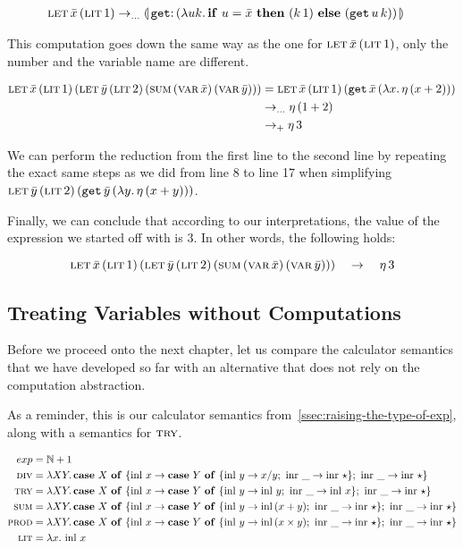 \begin{align*}
  \app{\lete}{\bar{x}}{\litec{1}}
&\to_{\ldots} \banana{\onto{\op{get}}{(\lam{u k}{\ifte{u = \bar{x}}{(\ap{k}{1})}{(\app{\op{get}}{u}{k})}})}}
\end{align*}

This computation goes down the same way as the one for
$\app{\lete}{\bar{x}}{\litec{1}}$, only the number and the variable name
are different.


\begin{align*}
\letecn{x}{\litec{1}}{\letec{y}{\litec{2}}{\sumec{\varec{x}}{\varec{y}}}}
& = \letecn{x}{\litec{1}}{(\app{\op{get}}{\bar{x}} {(\lam{x}{\ap{\eta}{(x + 2)}})})} \\
& \to_{\ldots} \ap{\eta}{(1 + 2)} \\
& \to_{+} \ap{\eta}{3}
\end{align*}

We can perform the reduction from the first line to the second line by
repeating the exact same steps as we did from line 8 to line 17 when
simplifying $\appp{\lete}{\bar{y}}{\litec{2}}
{(\app{\op{get}}{\bar{y}}{(\lam{y}{\ap{\eta}{(x + y)}})})}$.

Finally, we can conclude that according to our interpretations, the
value of the expression we started off with is $3$. In other words, the
following holds:

$$
\letecn{x}{\litec{1}}{\letec{y}{\litec{2}}{\sumec{\varec{x}}{\varec{y}}}}
\quad \to \quad
\ap{\eta}{3}
$$


\subsection{Treating Variables without Computations}

Before we proceed onto the next chapter, let us compare the calculator
semantics that we have developed so far with an alternative that does not
rely on the computation abstraction.

As a reminder, this is our calculator semantics
from~\ref{ssec:raising-the-type-of-exp}, along with a semantics for
$\trye$.

\begin{align*}
  exp &= \NN + 1 \\
  \dive &= \lam{X Y}{\case{X}{x}{\case{Y}{y}{x / y}{\_}{\ap{\inr}{\star}}}{\_}{\ap{\inr}{\star}}} \\ 
  \trye &= \lam{X Y}{\case{X}{x}{\case{Y}{y}{\ap{\inl}{y}}{\_}{\ap{\inl}{x}}}{\_}{\ap{\inr}{\star}}} \\ 
  \sume &= \lam{X Y}{\case{X}{x}{\case{Y}{y}{\ap{\inl}{(x + y)}}{\_}{\ap{\inr}{\star}}}{\_}{\ap{\inr}{\star}}} \\ 
  \prode &= \lam{X Y}{\case{X}{x}{\case{Y}{y}{\ap{\inl}{(x \times y)}}{\_}{\ap{\inr}{\star}}}{\_}{\ap{\inr}{\star}}} \\ 
  \lite &= \lam{x}{\ap{\inl}{x}}
\end{align*}

